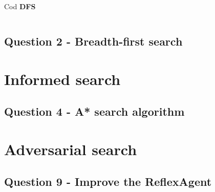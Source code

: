 \par Cod \textbf{DFS}
\inputminted[linenos]{python}{code/dfs.py}

\subsection{Question 2 - Breadth-first search}

\section{Informed search}
\subsection{Question 4 - A* search  algorithm}

\section{Adversarial search}
\subsection{Question 9 - Improve the ReflexAgent} 
